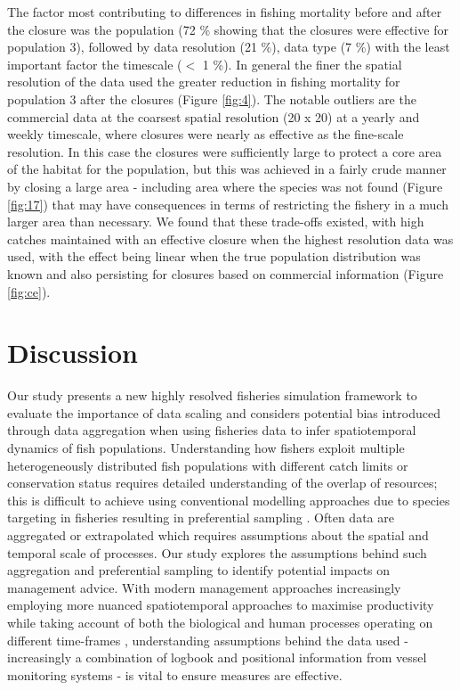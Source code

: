 \documentclass[review]{elsarticle}
\begin{document}
The factor most contributing to differences in fishing mortality before and
after the closure was the population (72 \% showing that the closures were
effective for population 3), followed by  data resolution (21 \%), data type (7
\%) with the least important factor the timescale ($<$ 1 \%). In general the
finer the spatial resolution of the data used the greater reduction in fishing
mortality for population 3 after the closures (Figure \ref{fig:4}). The notable
outliers are the commercial data at the coarsest spatial resolution (20 x 20)
at a yearly and weekly timescale, where closures were nearly as effective as
the fine-scale resolution. In this case the closures were sufficiently large to
protect a core area of the habitat for the population, but this was achieved in
a fairly crude manner by closing a large area - including area where the
species was not found (Figure \ref{fig:17}) that may have consequences in terms
of restricting the fishery in a much larger area than necessary. We found that
these trade-offs existed, with high catches maintained with an effective
closure when the highest resolution data was used, with the effect being linear
when the true population distribution was known and also persisting for
closures based on commercial information (Figure \ref{fig:ce}).\\

\section{Discussion}

Our study presents a new highly resolved fisheries simulation framework to
evaluate the importance of data scaling and considers potential bias introduced
through data aggregation when using fisheries data to infer spatiotemporal
dynamics of fish populations. Understanding how fishers exploit multiple
heterogeneously distributed fish populations with different catch limits or
conservation status requires detailed understanding of the overlap of
resources; this is difficult to achieve using conventional modelling approaches
due to species targeting in fisheries resulting in preferential sampling
\citep{Martinez-Minaya2018}. Often data are aggregated or extrapolated which
requires assumptions about the spatial and temporal scale of processes. Our
study explores the assumptions behind such aggregation and preferential
sampling to identify potential impacts on management advice. With modern
management approaches increasingly employing more nuanced spatiotemporal
approaches to maximise productivity while taking account of both the biological
and human processes operating on different time-frames \citep{Dunn2016},
understanding assumptions behind the data used - increasingly a combination of
logbook and positional information from vessel monitoring systems - is vital to
ensure measures are effective. \\
\end{document}
